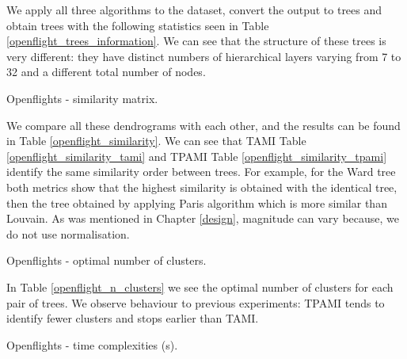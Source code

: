 We apply all three algorithms to the dataset, convert the output to trees and obtain trees with the following statistics seen in Table \ref{openflight_trees_information}. We can see that the structure of these trees is very different: they have distinct numbers of hierarchical layers varying from 7 to 32 and a different total number of nodes. 

\begin{table}[h]
	\centering
	\caption{Openflights - similarity matrix. \label{openflight_similarity}}
	\subfigure[TAMI.]{
		\centering
		 
		\label{openflight_similarity_tami}
	}
	\subfigure[TPAMI.]{
		
		\label{openflight_similarity_tpami}
	}
\end{table}

We compare all these dendrograms with each other, and the results can be found in Table \ref{openflight_similarity}. We can see that TAMI Table \ref{openflight_similarity_tami} and TPAMI Table \ref{openflight_similarity_tpami} identify the same similarity order between trees. For example, for the Ward tree both metrics show that the highest similarity is obtained with the identical tree, then the tree obtained by applying Paris algorithm which is more similar than Louvain. As was mentioned in Chapter \ref{design}, magnitude can vary because, we do not use normalisation. 

\begin{table}[h]
	\centering
	\caption{Openflights - optimal number of clusters.   \label{openflight_n_clusters}}
	\subfigure[TAMI.]{
		\centering
		 
	}
	\subfigure[TPAMI.]{
		
	}
\end{table}

In Table \ref{openflight_n_clusters} we see the optimal number of clusters for each pair of trees. We observe behaviour to previous experiments: TPAMI tends to identify fewer clusters and stops earlier than TAMI. 

\begin{table}[h]
	\centering
	\caption{Openflights - time complexities (s). \label{openflight_time}}
	\subfigure[TAMI.]{
		\centering
		 
	}
	\subfigure[TPAMI.]{
		
	}
\end{table}

